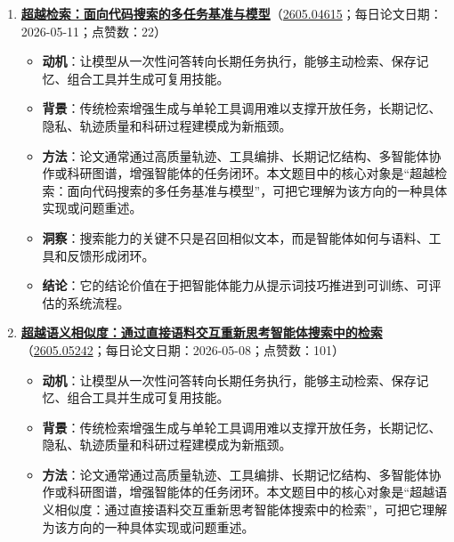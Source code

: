 \begin{enumerate}[leftmargin=1.5em]
\begin{itemize}[leftmargin=1.5em]
    \item \textbf{方法}：论文通常通过高质量轨迹、工具编排、长期记忆结构、多智能体协作或科研图谱，增强智能体的任务闭环。本文题目中的核心对象是“HyperEyes：面向并行多模态搜索智能体的双粒度效率感知强化学习”，可把它理解为该方向的一种具体实现或问题重述。
    \item \textbf{洞察}：搜索能力的关键不只是召回相似文本，而是智能体如何与语料、工具和反馈形成闭环。
    \item \textbf{结论}：它的结论价值在于把智能体能力从提示词技巧推进到可训练、可评估的系统流程。
  \end{itemize}
  \item \textbf{\href{https://huggingface.co/papers/2605.04615}{超越检索：面向代码搜索的多任务基准与模型}}（\href{https://arxiv.org/abs/2605.04615}{2605.04615}；每日论文日期：2026-05-11；点赞数：22）
  \begin{itemize}[leftmargin=1.5em]
    \item \textbf{动机}：让模型从一次性问答转向长期任务执行，能够主动检索、保存记忆、组合工具并生成可复用技能。
    \item \textbf{背景}：传统检索增强生成与单轮工具调用难以支撑开放任务，长期记忆、隐私、轨迹质量和科研过程建模成为新瓶颈。
    \item \textbf{方法}：论文通常通过高质量轨迹、工具编排、长期记忆结构、多智能体协作或科研图谱，增强智能体的任务闭环。本文题目中的核心对象是“超越检索：面向代码搜索的多任务基准与模型”，可把它理解为该方向的一种具体实现或问题重述。
    \item \textbf{洞察}：搜索能力的关键不只是召回相似文本，而是智能体如何与语料、工具和反馈形成闭环。
    \item \textbf{结论}：它的结论价值在于把智能体能力从提示词技巧推进到可训练、可评估的系统流程。
  \end{itemize}
  \item \textbf{\href{https://huggingface.co/papers/2605.05242}{超越语义相似度：通过直接语料交互重新思考智能体搜索中的检索}}（\href{https://arxiv.org/abs/2605.05242}{2605.05242}；每日论文日期：2026-05-08；点赞数：101）
  \begin{itemize}[leftmargin=1.5em]
    \item \textbf{动机}：让模型从一次性问答转向长期任务执行，能够主动检索、保存记忆、组合工具并生成可复用技能。
    \item \textbf{背景}：传统检索增强生成与单轮工具调用难以支撑开放任务，长期记忆、隐私、轨迹质量和科研过程建模成为新瓶颈。
    \item \textbf{方法}：论文通常通过高质量轨迹、工具编排、长期记忆结构、多智能体协作或科研图谱，增强智能体的任务闭环。本文题目中的核心对象是“超越语义相似度：通过直接语料交互重新思考智能体搜索中的检索”，可把它理解为该方向的一种具体实现或问题重述。

\end{itemize}
\end{enumerate}
